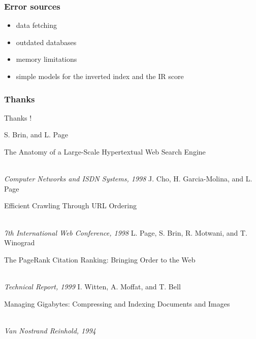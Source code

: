 \documentclass[10pt]{beamer}
\begin{document}
\begin{frame}
\frametitle{Error sources}
\begin{itemize}
\item data fetching
\item outdated databases
\item memory limitations
\item simple models for the inverted index and the IR score
\end{itemize}
\end{frame}

\begin{frame}
  \frametitle{Thanks}
  \begin{center}
    \huge{Thanks !}
  \end{center}
\end{frame}

\begin{frame}
  \begin{thebibliography}{1}
      S. Brin, and L. Page\\
      \begin{bf} The Anatomy of a Large-Scale Hypertextual Web Search Engine \end{bf}\\
      \emph{Computer Networks and ISDN Systems, 1998}
      J. Cho, H. Garcia-Molina, and L. Page\\
      \begin{bf} Efficient Crawling Through URL Ordering \end{bf}\\
      \emph{7th International Web Conference, 1998}
      L. Page, S. Brin, R. Motwani, and T. Winograd\\
      \begin{bf} The PageRank Citation Ranking: Bringing Order to the Web \end{bf}\\
      \emph{Technical Report, 1999}
      I. Witten, A. Moffat, and T. Bell\\
      \begin{bf} Managing Gigabytes: Compressing and Indexing Documents and Images \end{bf}\\
      \emph{Van Nostrand Reinhold, 1994}
  \end{thebibliography}
\end{frame}
\end{document}
